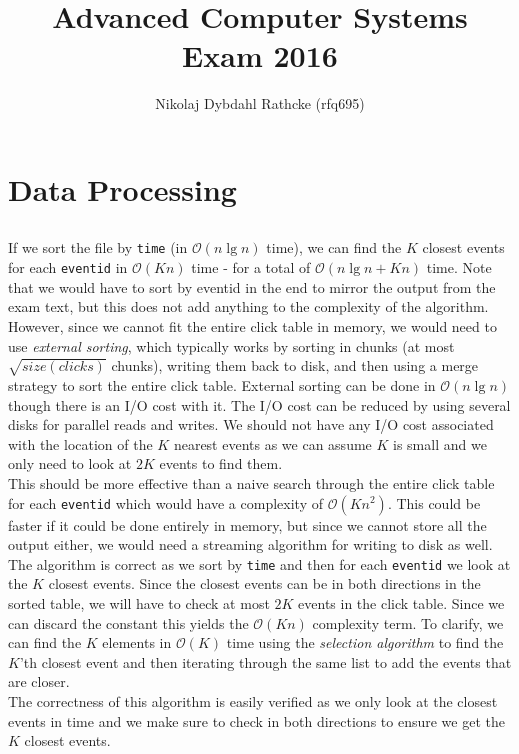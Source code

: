 \documentclass[a4paper]{article}
\author{Nikolaj Dybdahl Rathcke (rfq695)}
\title{Advanced Computer Systems \\ Exam 2016}
\begin{document}
\maketitle

\section{Data Processing}
\subsection{}
If we sort the file by \texttt{time} (in $\mathcal{O}(n\lg n)$ time), we can find the $K$ closest events for each \texttt{eventid} in $\mathcal{O}(Kn)$ time - for a total of $\mathcal{O}(n\lg n + Kn)$ time. Note that we would have to sort by eventid in the end to mirror the output from the exam text, but this does not add anything to the complexity of the algorithm. However, since we cannot fit the entire click table in memory, we would need to use \textit{external sorting}, which typically works by sorting in chunks (at most $\sqrt{size(clicks)}$ chunks), writing them back to disk, and then using a merge strategy to sort the entire click table. External sorting can be done in $\mathcal{O}(n\lg n)$ though there is an I/O cost with it. The I/O cost can be reduced by using several disks for parallel reads and writes. We should not have any I/O cost associated with the location of the $K$ nearest events as we can assume $K$ is small and we only need to look at $2K$ events to find them. \\
This should be more effective than a naive search through the entire click table for each \texttt{eventid} which would have a complexity of $\mathcal{O}(Kn^2)$. This could be faster if it could be done entirely in memory, but since we cannot store all the output either, we would need a streaming algorithm for writing to disk as well. \\
The algorithm is correct as we sort by \texttt{time} and then for each \texttt{eventid} we look at the $K$ closest events. Since the closest events can be in both directions in the sorted table, we will have to check at most $2K$ events in the click table. Since we can discard the constant this yields the $\mathcal{O}(Kn)$ complexity term. To clarify, we can find the $K$ elements in $\mathcal{O}(K)$ time using the \textit{selection algorithm} to find the $K$'th closest event and then iterating through the same list to add the events that are closer. \\
The correctness of this algorithm is easily verified as we only look at the closest events in time and we make sure to check in both directions to ensure we get the $K$ closest events.
\end{document}
